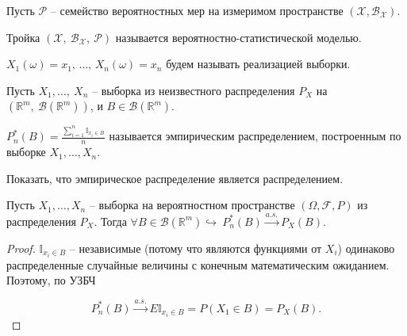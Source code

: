 Пусть $\displaystyle \mathcal{P}$ -- семейство вероятностных мер на измеримом пространстве $\displaystyle (\mathcal{X} ,\mathcal{B}_{\mathcal{X}})$.
\begin{definition}
	Тройка $\displaystyle (\mathcal{X},\ \mathcal{B}_{\mathcal{X}},\ \mathcal{P})$ называется вероятностно-статистической моделью.
\end{definition}
\begin{definition}
	$\displaystyle X_{1}( \omega ) =x_{1},\,\ldots,\, X_{n}(\omega) = x_{n}$ будем называть реализацией выборки.
\end{definition}
Пусть $\displaystyle X_{1} ,\dotsc,\ X_{n}$ -- выборка из неизвестного распределения $\displaystyle P_{X}$ на $\displaystyle \left(\mathbb{R}^{m},\ \mathcal{B}\left(\mathbb{R}^{m}\right)\right)$, и $\displaystyle B\in \mathcal{B}\left(\mathbb{R}^{m}\right)$.
\begin{definition}
	$\displaystyle P_{n}^{*}( B) =\frac{\sum _{i=1}^{n}\mathbb{I}_{x_{i} \in B}}{n}$ называется эмпирическим распределением, построенным по выборке $\displaystyle X_{1} ,\dotsc ,X_{n}$.
\end{definition}
\begin{exercise}
	Показать, что эмпирическое распределение является распределением.
\end{exercise}
\begin{proposition}
	Пусть $\displaystyle X_{1} ,\dotsc ,X_{n}$ -- выборка на вероятностном пространстве $\displaystyle ( \Omega ,\mathcal{F} ,P)$ из распределения $\displaystyle P_{X}$. Тогда $\displaystyle \forall B\in \mathcal{B}\left(\mathbb{R}^{m}\right) \hookrightarrow \ P_{n}^{*}( B)\xrightarrow{a.s.} P_{X}( B)$.
\end{proposition}
\begin{proof}
    $\displaystyle \mathbb{I}_{x_{i} \in B}$ -- независимые (потому что являются функциями от $\displaystyle X_{i}$) одинаково распределенные случайные величины с конечным математическим ожиданием. Поэтому, по УЗБЧ
    
    \begin{equation*}
    	P_{n}^{*}( B)\xrightarrow{a.s.} E\mathbb{I}_{x_{i} \in B} =P( X_{1} \in B) =P_{X}( B).
    \end{equation*}
\end{proof}

